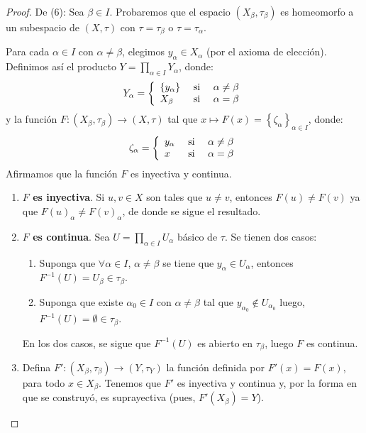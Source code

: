 \documentclass[12pt]{report}
\theoremstyle{largebreak}
\newcommand\cf[3]{\ensuremath{#1:#2\rightarrow#3}}
\begin{document}
\begin{proof}
        De (6): Sea $\beta\in I$. Probaremos que el espacio $(X_\beta,\tau_\beta)$ es homeomorfo a un subespacio de $(X,\tau)$ con $\tau=\tau_\beta$ o $\tau=\tau_\alpha$.

        Para cada $\alpha\in I$ con $\alpha\neq\beta$, elegimos $y_\alpha\in X_\alpha$ (por el axioma de elección). Definimos así el producto $Y=\prod_{\alpha\in I}Y_\alpha$, donde:
        \begin{equation*}
            Y_\alpha=\left\{
                \begin{array}{lcr}
                    \left\{y_\alpha\right\} & \textup{ si } & \alpha\neq\beta\\
                    X_\beta & \textup{ si } & \alpha=\beta\\
                \end{array}
            \right.
        \end{equation*}
        y la función $\cf{F}{(X_\beta,\tau_\beta)}{(X,\tau)}$ tal que $x\mapsto F(x)=\left\{\zeta_\alpha \right\}_{\alpha\in I}$, donde:
        \begin{equation*}
            \zeta_\alpha=\left\{
                \begin{array}{lcr}
                    y_\alpha & \textup{ si } & \alpha\neq\beta\\
                    x & \textup{ si } & \alpha=\beta\\
                \end{array}
            \right.
        \end{equation*}
        Afirmamos que la función $F$ es inyectiva y continua.
        \begin{enumerate}
            \item \textbf{$F$ es inyectiva}. Si $u,v\in X$ son tales que $u\neq v$, entonces $F(u)\neq F(v)$ ya que $F(u)_\alpha\neq F(v)_\alpha$, de donde se sigue el resultado.
            \item \textbf{$F$ es continua}. Sea $U=\prod_{\alpha\in I}U_\alpha$ básico de $\tau$. Se tienen dos casos:
            \begin{enumerate}
                \item Suponga que $\forall\alpha\in I$, $\alpha\neq\beta$ se tiene que $y_\alpha\in U_\alpha$, entonces $F^{-1}(U)=U_\beta\in\tau_\beta$.
                \item Suponga que existe $\alpha_0\in I$ con $\alpha\neq\beta$ tal que $y_{\alpha_0}\notin U_{\alpha_0}$ luego, $F^{-1}(U)=\emptyset\in\tau_\beta$.
            \end{enumerate}
            En los dos casos, se sigue que $F^{-1}(U)$ es abierto en $\tau_\beta$, luego $F$ es continua.
            \item Defina $\cf{F'}{(X_\beta,\tau_\beta)}{(Y,\tau_Y)}$ la función definida por $F'(x)=F(x)$, para todo $x\in X_\beta$. Tenemos que $F'$ es inyectiva y continua y, por la forma en que se construyó, es suprayectiva (pues, $F'(X_\beta)=Y$).
            

\end{enumerate}
\end{proof}
\end{document}
